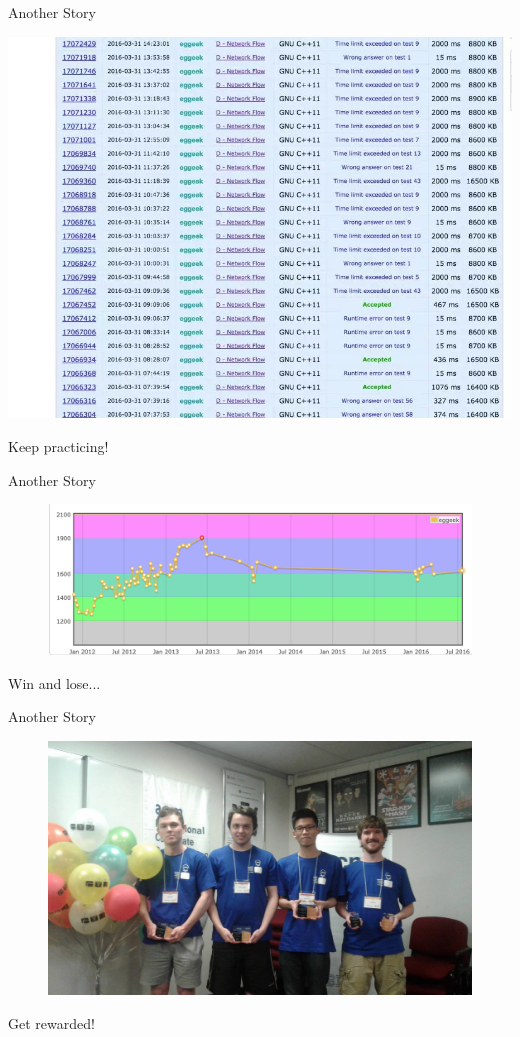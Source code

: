 \begin{frame}{Another Story}
\begin{minipage}{.75\textwidth}
  \begin{adjustbox}{max totalsize={1.\textwidth}{1.\textheight}, left}
  \centering
  \includegraphics[width=\textwidth]{pic/sub1.jpg}
  \end{adjustbox}
\end{minipage}%
\begin{minipage}{.25\textwidth}
  Keep practicing!
\end{minipage}
\end{frame}

\begin{frame}{Another Story}
  \begin{figure}
  \centering
  \includegraphics[width=\textwidth]{pic/rating.png}
  \end{figure}
  Win and lose...
\end{frame}

\begin{frame}{Another Story}
  \begin{figure}
  \centering
  \includegraphics[width=.7\textwidth]{pic/wf2016.jpg}
  \end{figure}
  Get rewarded!
\end{frame}

